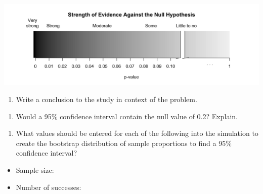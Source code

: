 \documentclass[
]{report}
\providecommand{\tightlist}{%
  \setlength{\itemsep}{0pt}\setlength{\parskip}{0pt}}
\begin{document}
\begin{center}\includegraphics[width=0.9\linewidth]{images/soe_gradient_gray} \end{center}

\vspace{0.2in}

\begin{enumerate}
\def\labelenumi{\arabic{enumi}.}
\setcounter{enumi}{8}
\tightlist
\item
  Write a conclusion to the study in context of the problem.
\end{enumerate}

\vspace{0.8in}

\begin{enumerate}
\def\labelenumi{\arabic{enumi}.}
\setcounter{enumi}{9}
\tightlist
\item
  Would a 95\% confidence interval contain the null value of 0.2? Explain.
\end{enumerate}

\vspace{0.8in}

\begin{enumerate}
\def\labelenumi{\arabic{enumi}.}
\setcounter{enumi}{10}
\tightlist
\item
  What values should be entered for each of the following into the simulation to create the bootstrap distribution of sample proportions to find a 95\% confidence interval?
  \vspace{1mm}
\end{enumerate}

\begin{itemize}
\tightlist
\item
  Sample size:
\end{itemize}

\vspace{.1in}

\begin{itemize}
\tightlist
\item
  Number of successes:
\end{itemize}
\end{document}
